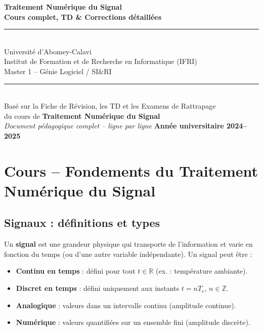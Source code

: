\documentclass[12pt,a4paper]{article}
\begin{document}

\begin{titlepage}
  \centering
  \vspace*{1cm}
  {\Huge\bfseries\color{coursbleu}
   Traitement Numérique du Signal\\[0.4em]
   \large Cours complet, TD \& Corrections détaillées}\\[2em]
  \rule{\textwidth}{1.5pt}\\[1em]
  {\large Université d'Abomey-Calavi\\
   Institut de Formation et de Recherche en Informatique (IFRI)\\[0.5em]
   Master 1 -- Génie Logiciel / SI\&RI}\\[2em]
  \rule{\textwidth}{0.5pt}\\[1.5em]
  {\normalsize Basé sur la Fiche de Révision, les TD et les Examens de Rattrapage\\
   du cours de \textbf{Traitement Numérique du Signal}}\\[3cm]
  {\small\itshape Document pédagogique complet -- ligne par ligne}
  \vfill
  {\large\bfseries Année universitaire 2024--2025}
\end{titlepage}

\tableofcontents
\newpage

\section{Cours -- Fondements du Traitement Numérique du Signal}

\subsection{Signaux : définitions et types}

\begin{tcolorbox}[coursbox, title=Définition -- Signal]
Un \textbf{signal} est une grandeur physique qui transporte de l'information et varie
en fonction du temps (ou d'une autre variable indépendante).
Un signal peut être :
\begin{itemize}[leftmargin=1.5em]
  \item \textbf{Continu en temps} : défini pour tout $t \in \mathbb{R}$ (ex. : température ambiante).
  \item \textbf{Discret en temps} : défini uniquement aux instants $t = nT_e$, $n \in \mathbb{Z}$.
  \item \textbf{Analogique} : valeurs dans un intervalle continu (amplitude continue).
  \item \textbf{Numérique} : valeurs quantifiées sur un ensemble fini (amplitude discrète).
\end{itemize}
\end{tcolorbox}
\end{document}
